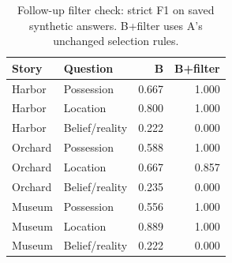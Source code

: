 \begin{table}[t]
\caption{Follow-up filter check: strict F1 on saved synthetic answers. B+filter uses A's unchanged selection rules.}\label{tab:filter}
\centering\small
\begin{tabular}{llrr}\toprule
Story & Question & B & B+filter\\\midrule
Harbor & Possession & 0.667 & 1.000 \\
Harbor & Location & 0.800 & 1.000 \\
Harbor & Belief/reality & 0.222 & 0.000 \\
Orchard & Possession & 0.588 & 1.000 \\
Orchard & Location & 0.667 & 0.857 \\
Orchard & Belief/reality & 0.235 & 0.000 \\
Museum & Possession & 0.556 & 1.000 \\
Museum & Location & 0.889 & 1.000 \\
Museum & Belief/reality & 0.222 & 0.000 \\
\bottomrule\end{tabular}
\end{table}
